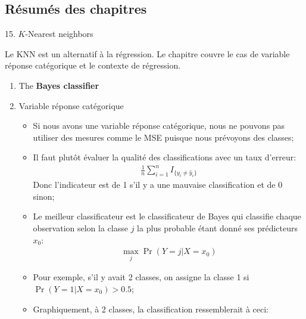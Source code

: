 \documentclass[12pt, titlepage, french]{report}
\begin{document}
\subsection{Résumés des chapitres}
\begin{CHPT_SUMM}[label = {PCA-KNN}]{15. $K$-Nearest neighbors}
Le KNN est un alternatif à la régression. Le chapitre couvre le cas de variable réponse catégorique et le contexte de régression.
\begin{enumerate}
	\item	The \textbf{Bayes classifier}
	\item[]	Variable réponse catégorique
	\begin{itemize}
		\item	Si nous avons une variable réponse catégorique, nous ne pouvons pas utiliser des mesures comme le MSE puisque nous prévoyons des classes;
		\item	Il faut plutôt évaluer la qualité des classifications avec un taux d'erreur:
			\begin{align*}
			\frac{1}{n} \sum_{i = 1}^{n} I_{\{y_{i} \neq \hat{y}_{i} \}}
			\end{align*}
				Donc l'indicateur est de 1 s'il y a une mauvaise classification et de 0 sinon;
		\item	Le meilleur classificateur est le classificateur de Bayes qui classifie chaque observation selon la classe $j$ la plus probable étant donné ses prédicteurs $x_{0}$:
			\begin{align*}
			\underset{j}{\max} \Pr(Y = j | X = x_{0})
			\end{align*}
		\item	Pour exemple, s'il y avait 2 classes, on assigne la classe 1 si $\Pr( Y = 1 | X = x_{0}) > 0.5$;
		\item	Graphiquement, à 2 classes, la classification ressemblerait à ceci:
		

\end{itemize}
\end{enumerate}
\end{CHPT_SUMM}
\end{document}
